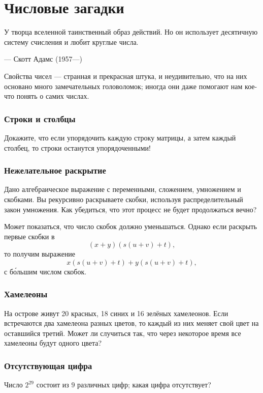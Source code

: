 \chapter{Числовые загадки}


\setlength{\epigraphwidth}{.85\textwidth}
\epigraph{У творца вселенной таинственный образ действий.
Но он использует десятичную систему счисления и любит круглые
числа.
}{--- Скотт Адамс (1957---)}


Свойства чисел --- странная и прекрасная штука, и неудивительно, что на них основано много замечательных головоломок; иногда они даже помогают нам кое-что понять о самих числах.

\subsection*{Строки и столбцы}

Докажите, что если упорядочить каждую строку матрицы, а затем каждый столбец, то строки останутся упорядоченными!

\subsection*{Нежелательное раскрытие}

Дано алгебраическое выражение с переменными, сложением, умножением и скобками.
Вы рекурсивно раскрываете скобки, используя распределительный закон умножения.
Как убедиться, что этот процесс не будет продолжаться вечно?

Может показаться, что число скобок должно уменьшаться.
Однако если раскрыть первые скобки в
\[(x + y)(s(u + v) + t),\]
то получим выражение
\[x(s(u + v) + t) + y(s(u + v) + t),\]
с б\'{о}льшим числом скобок.

\subsection*{Хамелеоны}

На острове живут 20 красных, 18 синих и 16 зелёных хамелеонов.
Если встречаются два хамелеона разных цветов, то каждый из них меняет свой цвет на оставшийся третий.
Может ли случиться так, что через некоторое время все хамелеоны будут одного цвета? 

\subsection*{Отсутствующая цифра}

Число $2^{29}$ состоит из $9$ различных цифр; какая цифра отсутствует?

